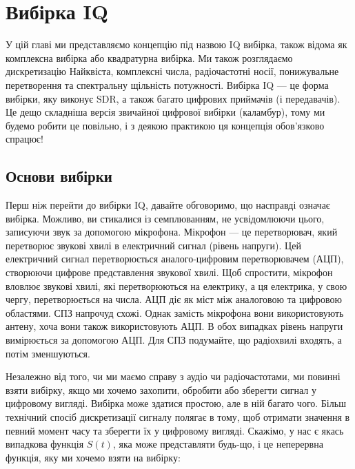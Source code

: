 \chapter{Вибірка IQ}\label{sampling-chapter}

У цій главі ми представляємо концепцію під назвою IQ вибірка, також
відома як комплексна вибірка або квадратурна вибірка. Ми також
розглядаємо дискретизацію Найквіста, комплексні числа, радіочастотні
носії, понижувальне перетворення та спектральну щільність потужності.
Вибірка IQ --- це форма вибірки, яку виконує SDR, а також багато
цифрових приймачів (і передавачів). Це дещо складніша версія звичайної
цифрової вибірки (каламбур), тому ми будемо робити це повільно, і з
деякою практикою ця концепція обов'язково спрацює!

\section{Основи
вибірки}\label{ux43eux441ux43dux43eux432ux438-ux432ux438ux431ux456ux440ux43aux438}

Перш ніж перейти до вибірки IQ, давайте обговоримо, що насправді означає
вибірка. Можливо, ви стикалися із семплюванням, не усвідомлюючи цього,
записуючи звук за допомогою мікрофона. Мікрофон --- це перетворювач,
який перетворює звукові хвилі в електричний сигнал (рівень напруги). Цей
електричний сигнал перетворюється аналого-цифровим перетворювачем (АЦП),
створюючи цифрове представлення звукової хвилі. Щоб спростити, мікрофон
вловлює звукові хвилі, які перетворюються на електрику, а ця електрика,
у свою чергу, перетворюється на числа. АЦП діє як міст між аналоговою та
цифровою областями. СПЗ напрочуд схожі. Однак замість мікрофона вони
використовують антену, хоча вони також використовують АЦП. В обох
випадках рівень напруги вимірюється за допомогою АЦП. Для СПЗ подумайте,
що радіохвилі входять, а потім зменшуються.

Незалежно від того, чи ми маємо справу з аудіо чи радіочастотами, ми
повинні взяти вибірку, якщо ми хочемо захопити, обробити або зберегти
сигнал у цифровому вигляді. Вибірка може здатися простою, але в ній
багато чого. Більш технічний спосіб дискретизації сигналу полягає в
тому, щоб отримати значення в певний момент часу та зберегти їх у
цифровому вигляді. Скажімо, у нас є якась випадкова функція \(S(t)\),
яка може представляти будь-що, і це неперервна функція, яку ми хочемо
взяти на вибірку:

